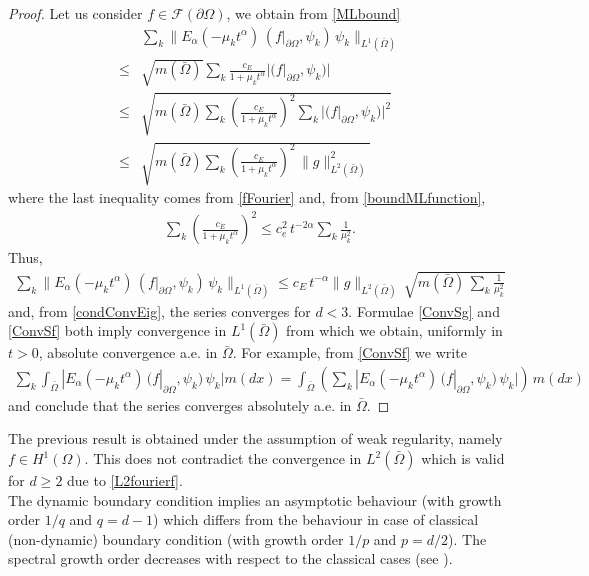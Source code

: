 \documentclass[11pt,a4paper]{article}
\begin{document}
\begin{proof}
Let us consider $f \in \mathcal{F}(\partial \Omega)$, we obtain from \eqref{MLbound}
\begin{align*}
& \sum_k \| E_\alpha(-\mu_k t^\alpha)\, (f|_{\partial \Omega}, \psi_k)\, \psi_k \|_{L^1(\bar{\Omega})}\\
\leq & \sqrt{m(\bar{ \Omega})} \sum_{k} \frac{c_E}{1 + \mu_k t^\alpha} |(f|_{\partial \Omega}, \psi_k)|\\
\leq &  \sqrt{m(\bar{ \Omega}) \sum_{k} \left(\frac{c_E}{1 + \mu_k t^\alpha}\right)^2  \sum_k |(f|_{\partial \Omega}, \psi_k)|^2}\\
\leq & \sqrt{m(\bar{ \Omega}) \sum_{k} \left(\frac{c_E}{1 + \mu_k t^\alpha}\right)^2 \, \| g \|^2_{L^2(\bar{\Omega})}}
\end{align*}
where the last inequality comes from \eqref{fFourier} and, from \eqref{boundMLfunction}, 
\begin{align*}
\sum_{k} \left(\frac{c_E}{1 + \mu_k t^\alpha} \right)^2 \leq c_e^2\, t^{-2\alpha} \sum_k \frac{1}{\mu_k^2}.
\end{align*}
Thus, 
\begin{align}
\sum_k \| E_\alpha(-\mu_k t^\alpha)\, (f|_{\partial \Omega}, \psi_k)\, \psi_k \|_{L^1(\bar{\Omega})} \leq  c_E\, t^{-\alpha} \|g \|_{L^2(\bar{\Omega})}\, \sqrt{m(\bar{\Omega}) \, \sum_k \frac{1}{\mu_k^2}}
\label{ConvSf}
\end{align}
and, from \eqref{condConvEig}, the series converges for $d<3$. Formulae \eqref{ConvSg} and \eqref{ConvSf} both imply convergence in $L^1(\bar{\Omega})$ from which we obtain, uniformly in $t>0$, absolute convergence a.e. in $\bar{\Omega}$. For example, from \eqref{ConvSf} we write
\begin{align*}
\sum_k \int_{\bar{\Omega}} | E_\alpha(-\mu_k t^\alpha)\, (f|_{\partial \Omega}, \psi_k)\, \psi_k | m(dx) = \int_{\bar{\Omega}} \left( \sum_k  | E_\alpha(-\mu_k t^\alpha)\, (f|_{\partial \Omega}, \psi_k)\, \psi_k | \right)\, m(dx)
\end{align*}
and conclude that the series converges absolutely a.e. in $\bar{\Omega}$. 
\end{proof}

The previous result is obtained under the assumption of weak regularity, namely $f \in H^1(\Omega)$. This does not contradict the convergence in $L^2(\bar{\Omega})$ which is valid for $d\geq 2$ due to \eqref{L2fourierf}.\\

The dynamic boundary condition implies an asymptotic behaviour (with growth order $1/q$ and $q=d-1$) which differs from the behaviour in case of classical (non-dynamic) boundary condition (with growth order $1/p$ and $p=d/2$). The spectral growth order decreases with respect to the classical cases (see \cite{vBelFra}). \\
\end{document}
